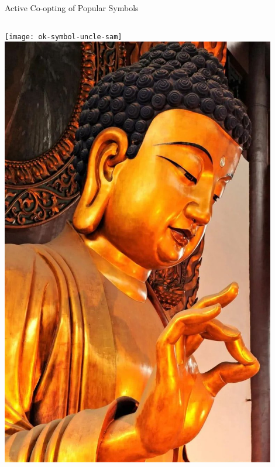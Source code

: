 \documentclass[nobackground,dvipsnames,table,aspectratio=169]{beamer}
\begin{document}
\begin{frame}{Active Co-opting of Popular Symbols}
    \begin{columns}
            \texttt{[image: ok-symbol-uncle-sam]}
            \includegraphics[width=0.9\textwidth]{ok-vitarka-mudra}
    \end{columns}
\end{frame}
\end{document}
